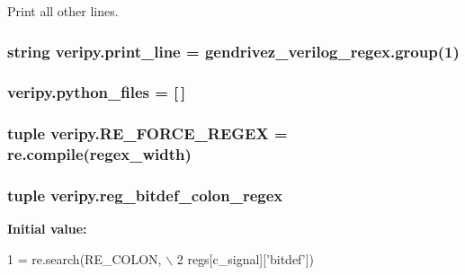 Print all other lines. 

\hypertarget{namespaceveripy_a842c59e3665a101ff8d4813809eae3ff}{
\subsubsection[{print\-\_\-line}]{\setlength{\rightskip}{0pt plus 5cm}string veripy.\-print\-\_\-line = gendrivez\-\_\-verilog\-\_\-regex.\-group(1)}}\label{namespaceveripy_a842c59e3665a101ff8d4813809eae3ff}
\hypertarget{namespaceveripy_afcb1d5102cf817e349a771a7df45f78e}{
\subsubsection[{python\-\_\-files}]{\setlength{\rightskip}{0pt plus 5cm}veripy.\-python\-\_\-files = \mbox{[}$\,$\mbox{]}}}\label{namespaceveripy_afcb1d5102cf817e349a771a7df45f78e}
\hypertarget{namespaceveripy_a92e4c231594631dc5b0b3fa84f28c05d}{
\subsubsection[{R\-E\-\_\-\-F\-O\-R\-C\-E\-\_\-\-R\-E\-G\-E\-X}]{\setlength{\rightskip}{0pt plus 5cm}tuple veripy.\-R\-E\-\_\-\-F\-O\-R\-C\-E\-\_\-\-R\-E\-G\-E\-X = re.\-compile({\bf regex\-\_\-width})}}\label{namespaceveripy_a92e4c231594631dc5b0b3fa84f28c05d}
\hypertarget{namespaceveripy_ab36a4deea02c6b2d407e6896250e385c}{
\subsubsection[{reg\-\_\-bitdef\-\_\-colon\-\_\-regex}]{\setlength{\rightskip}{0pt plus 5cm}tuple veripy.\-reg\-\_\-bitdef\-\_\-colon\-\_\-regex}}\label{namespaceveripy_ab36a4deea02c6b2d407e6896250e385c}
{\bfseries Initial value\-:}
\begin{DoxyCode}
1 = re.search(RE\_COLON, \(\backslash\)
2                                                 regs[c\_signal][\textcolor{stringliteral}{'bitdef'}])
\end{DoxyCode}


